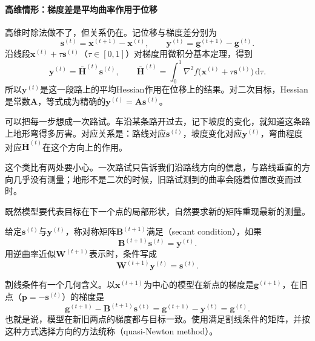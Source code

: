 \paragraph{高维情形：梯度差是平均曲率作用于位移}
高维时除法做不了，但关系仍在。记位移与梯度差分别为
\begin{equation}
 \bm{s}^{(t)}=\bm{x}^{(t+1)}-\bm{x}^{(t)},\qquad\bm{y}^{(t)}=\bm{g}^{(t+1)}-\bm{g}^{(t)}.
 \label{eq:qn-s-y}
\end{equation}
沿线段$\bm{x}^{(t)}+\tau\bm{s}^{(t)}$（$\tau\in[0,1]$）对梯度用微积分基本定理，得到
\begin{equation}
 \bm{y}^{(t)}=\bar{\bm{H}}^{(t)}\bm{s}^{(t)},\qquad
 \bar{\bm{H}}^{(t)}=\int_0^1\nabla^2f\bigl(\bm{x}^{(t)}+\tau\bm{s}^{(t)}\bigr)\,\mathrm{d}\tau.
 \label{eq:qn-average-hessian}
\end{equation}
所以$\bm{y}^{(t)}$是这一段路上的平均Hessian作用在位移上的结果。对二次目标，Hessian是常数$\bm{A}$，等式成为精确的$\bm{y}^{(t)}=\bm{A}\bm{s}^{(t)}$。

可以把每一步想成一次路试。车沿某条路开过去，记下坡度的变化，就知道这条路上地形弯得多厉害。对应关系是：路线对应$\bm{s}^{(t)}$，坡度变化对应$\bm{y}^{(t)}$，弯曲程度对应$\bar{\bm{H}}^{(t)}$在这个方向上的作用。

这个类比有两处要小心。一次路试只告诉我们沿路线方向的信息，与路线垂直的方向几乎没有测量；地形不是二次的时候，旧路试测到的曲率会随着位置改变而过时。

既然模型要代表目标在下一个点的局部形状，自然要求新的矩阵重现最新的测量。

\begin{definition}[割线条件]
\label{def:qn-secant}
给定$\bm{s}^{(t)}$与$\bm{y}^{(t)}$，称对称矩阵$\bm{B}^{(t+1)}$满足（secant condition），如果
\begin{equation}
 \bm{B}^{(t+1)}\bm{s}^{(t)}=\bm{y}^{(t)}.
 \label{eq:qn-secant}
\end{equation}
用逆曲率近似$\bm{W}^{(t+1)}$表示时，条件写成
\begin{equation}
 \bm{W}^{(t+1)}\bm{y}^{(t)}=\bm{s}^{(t)}.
 \label{eq:qn-secant-inverse}
\end{equation}
\end{definition}

割线条件有一个几何含义。以$\bm{x}^{(t+1)}$为中心的模型在新点的梯度是$\bm{g}^{(t+1)}$，在旧点（$\bm{p}=-\bm{s}^{(t)}$）的梯度是
\[
 \bm{g}^{(t+1)}-\bm{B}^{(t+1)}\bm{s}^{(t)}=\bm{g}^{(t+1)}-\bm{y}^{(t)}=\bm{g}^{(t)}.
\]
也就是说，模型在新旧两点的梯度都与目标一致。使用满足割线条件的矩阵，并按这种方式选择方向的方法统称（quasi-Newton method）。

